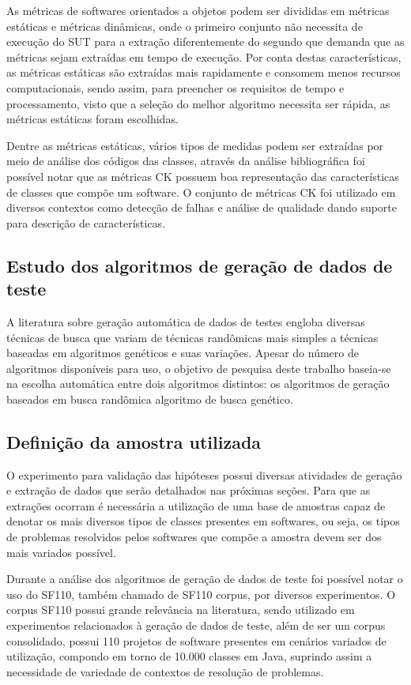 \documentclass[
	12pt,				%
	oneside,			%
	a4paper,			%
	english,			%
	brazil				%
	]{abntex2ppgsi}
\begin{document}
As métricas de softwares orientados a objetos podem ser divididas em métricas estáticas e métricas dinâmicas, onde o primeiro conjunto não necessita de execução do SUT para a extração diferentemente do segundo que demanda que as métricas sejam extraídas em tempo de execução. Por conta destas características, as métricas estáticas são extraídas mais rapidamente e consomem menos recursos computacionais, sendo assim, 
para preencher os requisitos de tempo e processamento, visto que a seleção do melhor algoritmo necessita ser rápida, as métricas estáticas foram escolhidas.

Dentre as métricas estáticas, vários tipos de medidas podem ser extraídas por meio de análise dos códigos das classes, através da análise bibliográfica foi possível notar que as métricas CK possuem boa representação das características de classes que compõe um software. O conjunto de métricas CK foi utilizado em diversos contextos como detecção de falhas e análise de qualidade dando suporte para descrição de características.

\subsection{Estudo dos algoritmos de geração de dados de teste}
A literatura sobre geração automática de dados de testes engloba diversas técnicas de busca que variam de técnicas randômicas mais simples a técnicas baseadas em algoritmos genéticos e suas variações. Apesar do número de algoritmos disponíveis para uso, o objetivo de pesquisa deste trabalho baseia-se na escolha automática entre dois algoritmos distintos: os algoritmos de geração baseados em busca randômica algoritmo de busca genético.



\subsection{Definição da amostra utilizada}
O experimento para validação das hipóteses possui diversas atividades de geração e extração de dados que serão detalhados nas próximas seções. Para que as extrações ocorram é necessária a utilização de uma base de amostras capaz de denotar os mais diversos tipos de classes presentes em softwares, ou seja, os tipos de problemas resolvidos pelos softwares que compõe a amostra devem ser dos mais variados possível.

Durante a análise dos algoritmos de geração de dados de teste foi possível notar o uso do SF110, também chamado de SF110 corpus, por diversos experimentos. O corpus SF110 possui grande relevância na literatura, sendo utilizado em experimentos relacionados à geração de dados de teste, além de ser um corpus consolidado, possui 110 projetos de software presentes em cenários variados de utilização, compondo em torno de 10.000 classes em Java, suprindo assim a necessidade de variedade de contextos de resolução de problemas.
\end{document}
